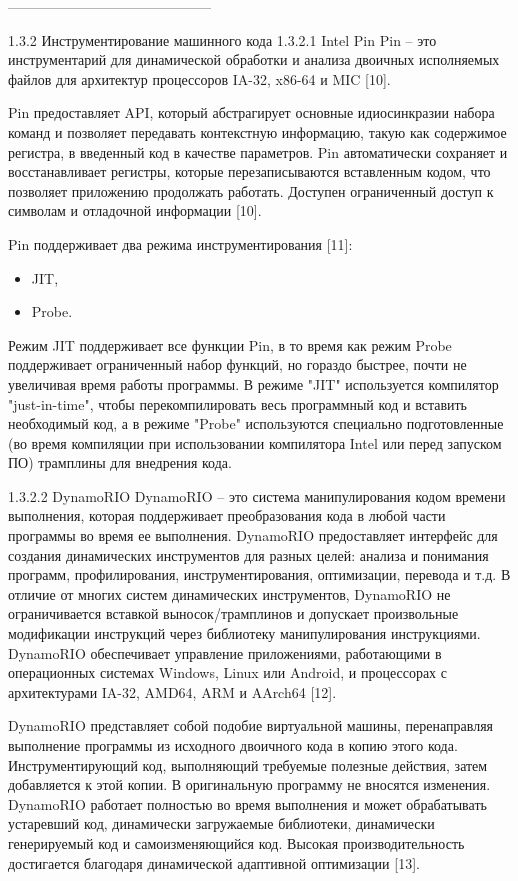 --------------------------------------------

1.3.2 Инструментирование машинного кода
1.3.2.1 Intel Pin
Pin -- это инструментарий для динамической обработки и анализа двоичных исполняемых файлов для архитектур процессоров IA-32, x86-64 и MIC [10].

Pin предоставляет API, который абстрагирует основные идиосинкразии набора команд и позволяет передавать контекстную информацию, такую как содержимое регистра, в введенный код в качестве параметров. Pin автоматически сохраняет и восстанавливает регистры, которые перезаписываются вставленным кодом, что позволяет приложению продолжать работать. Доступен ограниченный доступ к символам и отладочной информации [10].

Pin поддерживает два режима инструментирования [11]:
\begin{itemize}
  \item JIT,
  \item Probe.
\end{itemize}

Режим JIT поддерживает все функции Pin, в то время как режим Probe поддерживает ограниченный набор функций, но гораздо быстрее, почти не увеличивая время работы программы. В режиме "JIT" используется компилятор "just-in-time", чтобы перекомпилировать весь программный код и вставить необходимый код, а в режиме "Probe" используются специально подготовленные (во время компиляции при использовании компилятора Intel или перед запуском ПО) трамплины для внедрения кода.

1.3.2.2 DynamoRIO
DynamoRIO -- это система манипулирования кодом времени выполнения, которая поддерживает преобразования кода в любой части программы во время ее выполнения. DynamoRIO предоставляет интерфейс для создания динамических инструментов для разных целей: анализа и понимания программ, профилирования, инструментирования, оптимизации, перевода и т.д. В отличие от многих систем динамических инструментов, DynamoRIO не ограничивается вставкой выносок/трамплинов и допускает произвольные модификации инструкций через библиотеку манипулирования инструкциями. DynamoRIO обеспечивает управление приложениями, работающими в операционных системах Windows, Linux или Android, и процессорах с архитектурами IA-32, AMD64, ARM и AArch64 [12].

DynamoRIO представляет собой подобие виртуальной машины, перенаправляя выполнение программы из исходного двоичного кода в копию этого кода. Инструментирующий код, выполняющий требуемые полезные действия, затем добавляется к этой копии. В оригинальную программу не вносятся изменения. DynamoRIO работает полностью во время выполнения и может обрабатывать устаревший код, динамически загружаемые библиотеки, динамически генерируемый код и самоизменяющийся код. Высокая производительность достигается благодаря динамической адаптивной оптимизации [13].

